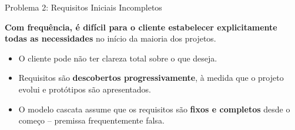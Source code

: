 \documentclass[9pt]{beamer}
\begin{document}
\begin{frame}{Problema 2: Requisitos Iniciais Incompletos}
  \begin{center}
  \end{center}

  \vspace{0.2cm}
  \textbf{Com frequência, é difícil para o cliente estabelecer explicitamente todas as necessidades} no início da maioria dos projetos.

  \vspace{0.3cm}
  \begin{itemize}
    \item O cliente pode não ter clareza total sobre o que deseja.
    \item Requisitos são \textbf{descobertos progressivamente}, à medida que o projeto evolui e protótipos são apresentados.
    \item O modelo cascata assume que os requisitos são \textbf{fixos e completos} desde o começo -- premissa frequentemente falsa.
  \end{itemize}
\end{frame}
\end{document}
